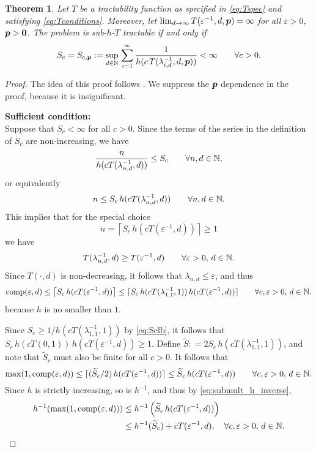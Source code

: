 \documentclass[sort&compress]{elsarticle}
\newtheorem{theorem}{Theorem}
\begin{document}
\begin{theorem}\label{thm:subhT}
	Let $T$ be a tractability function as specified in \eqref{eq:Tspec} and satisfying \eqref{eq:Tconditions}.  Moreover, let $\lim_{d \to \infty} T(\varepsilon^{-1},d,\boldsymbol{p}) = \infty$ for all $\varepsilon > 0$, $\boldsymbol{p} > \boldsymbol{0}$.  The problem is sub-$h$-$T$ tractable if and only if
	\[
	S_c = S_{c,\boldsymbol{p}} :=\sup_{d\in\mathbb{N}}  \, \sum_{i=1}^\infty \frac1{h(c\, T(\lambda_{i,d}^{-1},d,\boldsymbol{p}))} <\infty \qquad \forall c > 0.
	\]
\end{theorem}
\begin{proof}
The idea of this proof follows \cite{WerWoz17a}.
We suppress the $\boldsymbol{p}$ dependence in the proof, because it is insignificant.

\bigskip

\noindent \textbf{Sufficient condition:}\\
Suppose that $S_c <\infty$ for all $c>0$.  Since the terms of the series in the definition of $S_c$ are non-increasing, we have
	\[
		\frac{n}{h(cT(\lambda_{n,d}^{-1},d))}\le S_c \qquad \forall n,d \in \mathbb{N},
	\]
or equivalently
\begin{equation} \label{eq:Sclb}
	n\le S_c \, h(cT(\lambda_{n,d}^{-1},d))   \qquad \forall n,d \in \mathbb{N}.
\end{equation}
This implies that for the special choice
\[
	n = \left\lceil
	S_c \, h(cT(\varepsilon^{-1},d))
	\right\rceil \ge 1
\]
	we have
	\[
	T(\lambda_{n,d}^{-1},d) \ge T(\varepsilon^{-1},d) \qquad \forall \varepsilon > 0, \, d \in \mathbb{N}.
	\]
Since $T(\cdot,d)$ is non-decreasing, it follows that $\lambda_{n,d} \le \varepsilon$, and thus
\[
\operatorname{comp}(\varepsilon,d) \le  \left\lceil
S_c \, h(cT(\varepsilon^{-1},d))
\right\rceil \le   \lceil
S_c \, h(cT(\lambda_{1,1}^{-1},1)) \, h(cT(\varepsilon^{-1},d))
\rceil\qquad \forall c, \varepsilon > 0, \, d \in \mathbb{N}.
\]
because $h$ is no smaller than $1$.

Since $S_c \ge 1/h(cT(\lambda_{1,1}^{-1},1))$ by \eqref{eq:Sclb}, it follows that $S_c \, h(cT(0,1)) \, h(cT(\varepsilon^{-1},d))  \ge 1$.  Define $\widetilde{S} : = 2 S_c \, h(cT(\lambda_{1,1}^{-1},1))$, and note that $\widetilde{S}_c$ must also be finite for all $c > 0$.  It follows that
\begin{equation*}
\max(1,\operatorname{comp}(\varepsilon,d))
 \le \lceil
(\widetilde{S}_c/2) \, h(cT(\varepsilon^{-1},d))
\rceil  \le   \widetilde{S}_c \, h(cT(\varepsilon^{-1},d))
\qquad\forall c, \varepsilon > 0, \, d \in \mathbb{N}.
\end{equation*}
Since $h$ is strictly increasing, so is $h^{-1}$, and thus by \eqref{eq:submult_h_inverse},
\begin{align*}
h^{-1}(\max(1,\operatorname{comp}(\varepsilon,d)) ) & \le  h^{-1} \left(
\widetilde{S}_c \, h(cT(\varepsilon^{-1},d))  \right)
\\
&  \le  h^{-1}  (\widetilde{S}_c) + cT (\varepsilon^{-1},d),
\quad \forall c, \varepsilon > 0, \, d \in \mathbb{N}.
\end{align*}


\end{proof}
\end{document}
